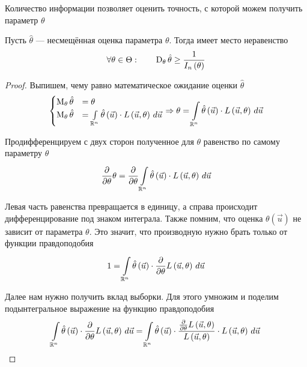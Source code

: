 Количество информации позволяет оценить точность,
с которой можем получить параметр $\theta$

\begin{theorem}
  \label{theorem:Rao-Kramer}
  Пусть $\hat{\theta}$ --- несмещённая оценка параметра $\theta$.
  Тогда имеет место неравенство
  \begin{equation*}
    \forall\theta\in\Theta:\qquad
    \dispersionof{\theta}{\hat{\theta}}
    \ge\frac{1}{I_n\left(\theta\right)}
  \end{equation*}
\end{theorem}
\begin{proof}
  Выпишем, чему равно математическое ожидание оценки $\hat{\theta}$
  $$\begin{cases}
    \meanof{\theta}{\hat{\theta}}
      &=\theta\\
    \meanof{\theta}{\hat{\theta}}
      &=\integral{\mathbb{R}^n}{}{\vec{u}}{
        \hat{\theta}\left( \vec{u} \right)
          \cdot L\left( \vec{u},\theta \right)}
    \end{cases}
    \Rightarrow
    \theta=\integral{\mathbb{R}^n}{}{\vec{u}}{
        \hat{\theta}\left( \vec{u} \right)
          \cdot L\left( \vec{u},\theta \right)}$$

  Продифференцируем с двух сторон полученное для $\theta$ равенство
  по самому параметру $\theta$
  $$\frac{\partial}{\partial \theta}\theta
    = \frac{\partial}{\partial \theta}\integral{\mathbb{R}^n}{}{\vec{u}}{
        \hat{\theta}\left( \vec{u} \right)
          \cdot L\left( \vec{u},\theta \right)}$$

  Левая часть равенства превращается в единицу,
  а справа происходит дифференцирование под знаком интеграла.
  Также помним, что оценка $\theta\left( \vec{u} \right)$
  не зависит от параметра $\theta$.
  Это значит, что производную нужно брать только от функции правдоподобия
  $$1 = \integral{\mathbb{R}^n}{}{\vec{u}}{\hat{\theta}\left( \vec{u} \right)
    \cdot \frac{\partial}{\partial \theta}L\left( \vec{u},\theta \right)}$$

  Далее нам нужно получить вклад выборки.
  Для этого умножим и поделим подынтегральное выражение
  на функцию правдоподобия
  $$\integral{\mathbb{R}^n}{}{\vec{u}}{\hat{\theta}\left( \vec{u} \right)
    \cdot \frac{\partial}{\partial \theta}L\left( \vec{u},\theta \right)}
  = \integral{\mathbb{R}^n}{}{\vec{u}}{\hat{\theta}\left( \vec{u} \right)
    \cdot \frac{
      \frac{\partial}{\partial \theta}L\left( \vec{u},\theta \right)}
      {L\left( \vec{u},\theta \right)}
        \cdot L\left( \vec{u},\theta \right)}$$


\end{proof}
